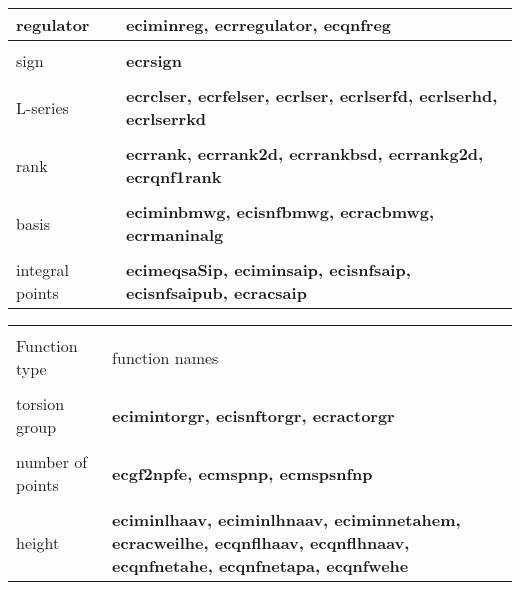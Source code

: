\begin{center}
\begin{tabular}{|p{1.1in}|p{4.0in}|}
regulator &
{\bf eciminreg, ecrregulator, ecqnfreg } \\[1.5ex]
\hline &\\[-1.3ex]

sign &
{\bf ecrsign } \\[1.5ex]
\hline &\\[-1.3ex]

L-series &
{\bf ecrclser, ecrfelser, ecrlser, ecrlserfd, ecrlserhd, \newline
        ecrlserrkd } \\[1.5ex]
\hline &\\[-1.3ex]

rank &
{\bf ecrrank, ecrrank2d, ecrrankbsd, ecrrankg2d, \newline
        ecrqnf1rank } \\[1.5ex]
\hline &\\[-1.3ex]

basis &
{\bf eciminbmwg, ecisnfbmwg, ecracbmwg, ecrmaninalg } \\[1.5ex]
\hline &\\[-1.3ex]

integral points &
{\bf ecimeqsaSip, eciminsaip, ecisnfsaip, ecisnfsaipub, \newline
        ecracsaip } \\[1.5ex]
\hline 
\end{tabular}
\end{center}

\newpage

\leer
\begin{center}
\begin{tabular}{|p{1.1in}|p{4.0in}|}
\hline &\\[-1.3ex]
Function type  &
function names\\[1.5ex]
\hline &\\[-1.3ex]

torsion group &
{\bf ecimintorgr, ecisnftorgr, ecractorgr } \\[1.5ex]
\hline &\\[-1.3ex]

number of points &
{\bf ecgf2npfe, ecmspnp, ecmspsnfnp } \\[1.5ex]
\hline &\\[-1.3ex]

height &
{\bf eciminlhaav, eciminlhnaav, eciminnetahem, \newline
        ecracweilhe, ecqnflhaav, ecqnflhnaav, \newline
        ecqnfnetahe, ecqnfnetapa, ecqnfwehe } \\[1.5ex]
\hline 
\end{tabular}
\end{center}

